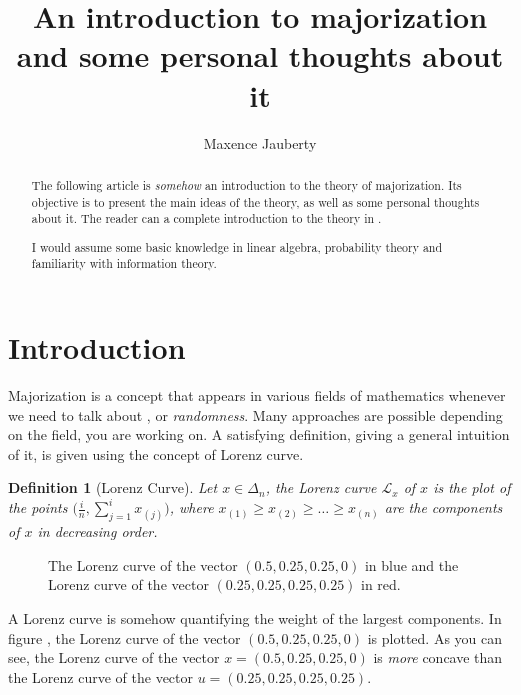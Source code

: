 \documentclass[a4paper]{article}
\newtheorem{definition}{Definition}
\begin{document}
\author{Maxence Jauberty}
\title{An introduction to majorization and some personal thoughts about it}
\maketitle
\begin{abstract}
    The following article is \textit{somehow} an introduction to the theory of majorization.
    Its objective is to present the main ideas of the theory, as well as some personal thoughts about it.
    The reader can a complete introduction to the theory in \cite{marshall2011inequalities}.

    I would assume some basic knowledge in linear algebra, probability theory and familiarity with information theory.
\end{abstract}
\section{Introduction}
Majorization is a concept that appears in various fields of mathematics whenever we need 
to talk about , or \textit{randomness}.  
Many approaches are possible depending on the field, you are working on. A satisfying definition, giving
a general intuition of it, is given using the concept of Lorenz curve.
\begin{definition}[Lorenz Curve] Let \(x\in\Delta_n\), the Lorenz curve \(\mathcal{L}_x\) of \(x\) is the plot of the points 
\(\biggl(\frac{i}{n}, \sum_{j=1}^i x_{(j)}\biggr)\), where \(x_{(1)}\geq x_{(2)}\geq \ldots \geq x_{(n)}\) are the components of \(x\) in decreasing order.
\end{definition}
\begin{figure}
    \centering
    \label{fig:lorenz}
    \caption{The Lorenz curve of the vector \((0.5,0.25,0.25,0)\) in blue and the Lorenz curve of the vector \((0.25,0.25,0.25,0.25)\) in red.}
\end{figure}
A Lorenz curve is somehow quantifying the weight of the largest components. In figure , the Lorenz curve of the vector \((0.5,0.25,0.25,0)\) is plotted.
As you can see, the Lorenz curve of the vector \(x = (0.5,0.25,0.25,0)\) is \textit{more} concave than the Lorenz curve of the vector \(u=(0.25,0.25,0.25,0.25)\).
\end{document}

